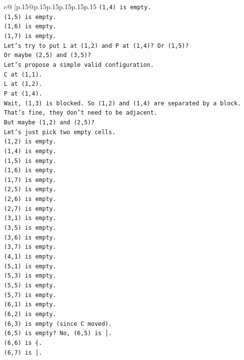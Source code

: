 \documentclass{article}
\begin{document}
{\begin{supertabular}{c@{$\;$}|p{.15\linewidth}@{}p{.15\linewidth}p{.15\linewidth}p{.15\linewidth}p{.15\linewidth}p{.15\linewidth}}
{{{\texttt{(1,4) is empty.} \\
\texttt{(1,5) is empty.} \\
\texttt{(1,6) is empty.} \\
\texttt{(1,7) is empty.} \\
\texttt{Let's try to put L at (1,2) and P at (1,4)? Or (1,5)?} \\
\texttt{Or maybe (2,5) and (3,5)?} \\
\texttt{Let's propose a simple valid configuration.} \\
\texttt{C at (1,1).} \\
\texttt{L at (1,2).} \\
\texttt{P at (1,4).} \\
\texttt{Wait, (1,3) is blocked. So (1,2) and (1,4) are separated by a block. That's fine, they don't need to be adjacent.} \\
\texttt{But maybe (1,2) and (2,5)?} \\
\texttt{Let's just pick two empty cells.} \\
\texttt{(1,2) is empty.} \\
\texttt{(1,4) is empty.} \\
\texttt{(1,5) is empty.} \\
\texttt{(1,6) is empty.} \\
\texttt{(1,7) is empty.} \\
\texttt{(2,5) is empty.} \\
\texttt{(2,6) is empty.} \\
\texttt{(2,7) is empty.} \\
\texttt{(3,1) is empty.} \\
\texttt{(3,5) is empty.} \\
\texttt{(3,6) is empty.} \\
\texttt{(3,7) is empty.} \\
\texttt{(4,1) is empty.} \\
\texttt{(5,1) is empty.} \\
\texttt{(5,3) is empty.} \\
\texttt{(5,5) is empty.} \\
\texttt{(5,7) is empty.} \\
\texttt{(6,1) is empty.} \\
\texttt{(6,2) is empty.} \\
\texttt{(6,3) is empty (since C moved).} \\
\texttt{(6,5) is empty? No, (6,5) is │.} \\
\texttt{(6,6) is ┤.} \\
\texttt{(6,7) is │.} \\
}}}
\end{supertabular}}
\end{document}
